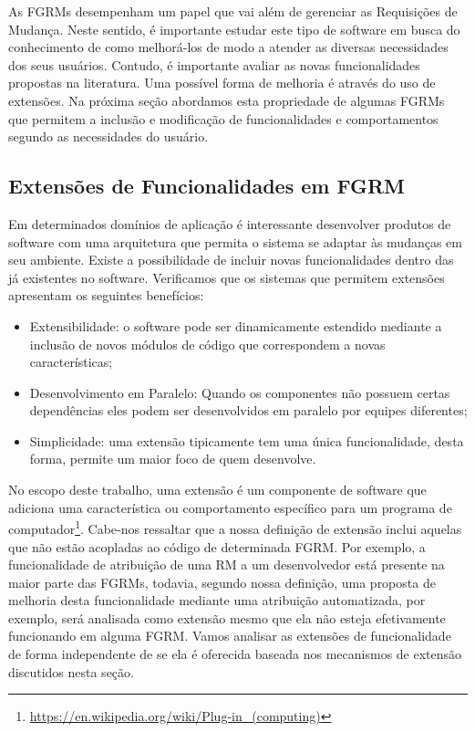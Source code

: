 As FGRMs desempenham um papel que vai além de gerenciar as Requisições de
Mudança. Neste sentido, é importante estudar este tipo de software em busca do
conhecimento de como melhorá-los de modo a atender as diversas necessidades dos
seus usuários. Contudo, é importante avaliar as novas funcionalidades propostas
na li\-te\-ra\-tu\-ra. Uma possível forma de melhoria é através do uso de
extensões. Na próxima seção abordamos esta propriedade de algumas FGRMs que
permitem a inclusão e modificação de funcionalidades e comportamentos segundo as
necessidades do usuário.

\subsection{Extensões de Funcionalidades em FGRM}\label{subsec:manutencao_visao_geral_extensoes_fgrm}

Em determinados domínios de aplicação é interessante desenvolver produtos de
software com uma arquitetura que permita o sistema se adaptar às mudanças em
seu ambiente. Existe a possibilidade de incluir novas funcionalidades dentro
das já existentes no software. Verificamos que os sistemas que permitem
extensões apresentam os seguintes benefícios:

\begin{itemize}

    \item Extensibilidade: o software pode ser dinamicamente estendido mediante
        a inclusão de novos módulos de código que correspondem a novas
        características;

    \item Desenvolvimento em Paralelo: Quando os componentes não possuem certas
        dependências eles podem ser desenvolvidos em paralelo por equipes
        diferentes;

    \item Simplicidade: uma extensão tipicamente tem uma única funcionalidade,
        desta forma, permite um maior foco de quem desenvolve.

\end{itemize}

No escopo deste trabalho, uma extensão é um componente de software que adiciona
uma característica ou comportamento específico para um programa de
computador\footnote{\url{https://en.wikipedia.org/wiki/Plug-in\_(computing)}}.
Cabe-nos ressaltar que a nossa definição de extensão inclui aquelas que não
estão acopladas ao código de determinada FGRM\@. Por exemplo, a funcionalidade
de atribuição de uma RM a um desenvolvedor está presente na maior parte das
FGRMs, todavia, segundo nossa definição, uma proposta de melhoria desta
funcionalidade mediante uma atribuição automatizada, por exemplo, será
analisada como extensão mesmo que ela não esteja efetivamente funcionando em
alguma FGRM\@. Vamos a\-na\-li\-sar as extensões de funcionalidade de forma
independente de se ela é oferecida baseada nos mecanismos de extensão
discutidos nesta seção.

